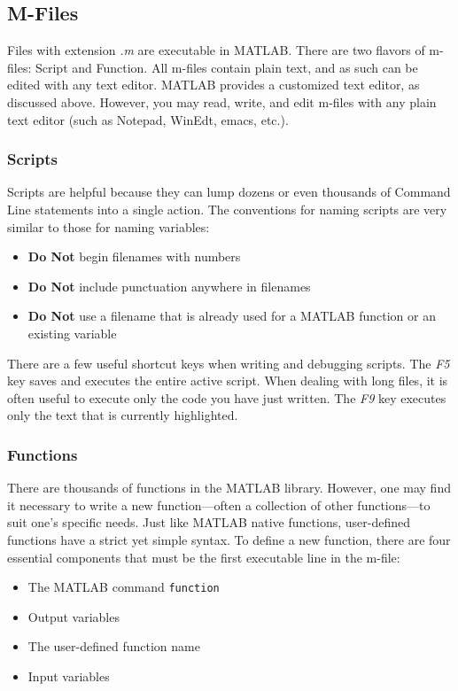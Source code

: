 \subsection{M-Files}
Files with extension \textit{.m} are executable in MATLAB.  There are two flavors of m-files: Script and Function.  All m-files contain plain text, and as such can be edited with any text editor.  MATLAB provides a customized text editor, as discussed above.  However, you may read, write, and edit m-files with any plain text editor (such as Notepad, WinEdt, emacs, etc.).

\subsubsection{Scripts}
Scripts are helpful because they can lump dozens or even thousands of Command Line statements into a single action.  The conventions for naming scripts are very similar to those for naming variables:
\begin{itemize}
    \item \textbf{Do Not} begin filenames with numbers
    \item \textbf{Do Not} include punctuation anywhere in filenames
    \item \textbf{Do Not} use a filename that is already used for a MATLAB function or an existing variable
\end{itemize}

There are a few useful shortcut keys when writing and debugging scripts.  The \textit{F5} key saves and executes the entire active script.  When dealing with long files, it is often useful to execute only the code you have just written. The \textit{F9} key executes only the text that is currently highlighted.

\subsubsection{Functions} \label{sec.matlab.funcs}
There are thousands of functions in the MATLAB library.  However, one may find it necessary to write a new function---often a collection of other functions---to suit one's specific needs.  Just like MATLAB native functions, user-defined functions have a strict yet simple syntax.  To define a new function, there are four essential components that must be the first executable line in the m-file:
\begin{itemize}
    \item The MATLAB command \verb=function=
    \item Output variables
    \item The user-defined function name
    \item Input variables
\end{itemize}

